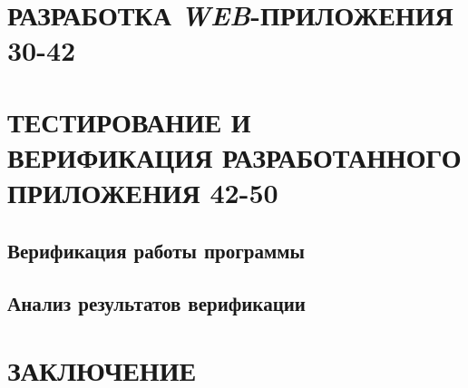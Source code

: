 \documentclass[12pt,a4paper]{styles/report}
\begin{document}
\chapter{РАЗРАБОТКА \textit{WEB}-ПРИЛОЖЕНИЯ 30-42}

\chapter{ТЕСТИРОВАНИЕ И ВЕРИФИКАЦИЯ РАЗРАБОТАННОГО ПРИЛОЖЕНИЯ 42-50}
\section{Верификация работы программы}
\section{Анализ результатов верификации}

\newpage
\chapter*{ЗАКЛЮЧЕНИЕ}


\newpage
\begin{thebibliography}{9999.}



\end{thebibliography}


\end{document}
